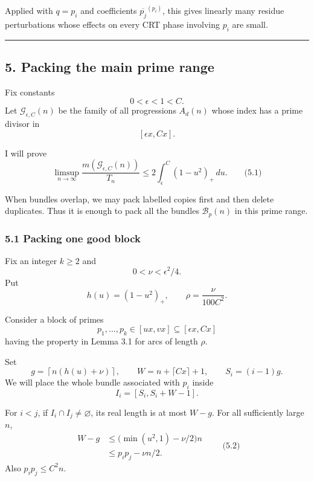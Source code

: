 \documentclass[
  11pt,
  a4paper,
]{article}
\begin{document}
Applied with \(q=p_i\) and coefficients \(\overline{p_j}^{(p_i)}\), this
gives linearly many residue perturbations whose effects on every CRT
phase involving \(p_i\) are small.

\begin{center}\rule{0.5\linewidth}{0.5pt}\end{center}

\subsection{5. Packing the main prime
range}\label{packing-the-main-prime-range}

Fix constants \[
0<\epsilon<1<C.
\] Let \(\mathcal G_{\epsilon,C}(n)\) be the family of all progressions
\(A_d(n)\) whose index has a prime divisor in \[
[\epsilon x,Cx].
\]

I will prove \[
\limsup_{n\to\infty}
\frac{m(\mathcal G_{\epsilon,C}(n))}{T_n}
\le
2\int_\epsilon^C(1-u^2)_+\,du.
\qquad\text{(5.1)}
\]

When bundles overlap, we may pack labelled copies first and then delete
duplicates. Thus it is enough to pack all the bundles
\(\mathcal B_p(n)\) in this prime range.

\subsubsection{5.1 Packing one good block}\label{packing-one-good-block}

Fix an integer \(k\ge2\) and \[
0<\nu<\epsilon^2/4.
\] Put \[
h(u)=(1-u^2)_+,
\qquad
\rho=\frac{\nu}{100C^2}.
\]

Consider a block of primes \[
p_1,\ldots,p_k\in[ux,vx]\subseteq[\epsilon x,Cx]
\] having the property in Lemma 3.1 for arcs of length \(\rho\).

Set \[
g=\left\lceil n(h(u)+\nu)\right\rceil,
\qquad
W=n+\lceil Cx\rceil+1,
\qquad
S_i=(i-1)g.
\] We will place the whole bundle associated with \(p_i\) inside \[
I_i=[S_i,S_i+W-1].
\]

For \(i<j\), if \(I_i\cap I_j\ne\varnothing\), its real length is at
most \(W-g\). For all sufficiently large \(n\), \begin{equation*}
\begin{aligned}
W-g
&\le \bigl(\min(u^2,1)-\nu/2\bigr)n\\
&\le p_ip_j-\nu n/2.
\end{aligned}
\qquad\text{(5.2)}
\end{equation*} Also \(p_ip_j\le C^2n\).
\end{document}
